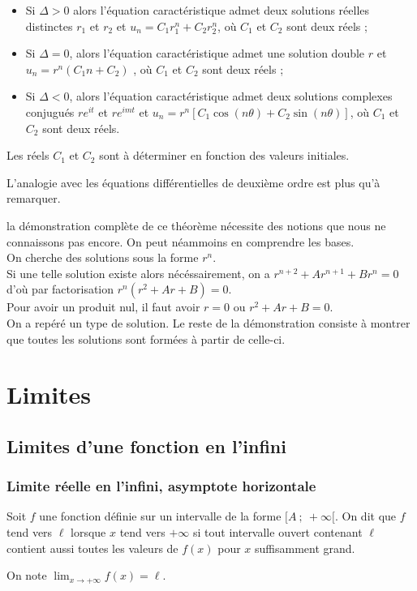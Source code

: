\documentclass[french]{book}
\newcommand{\ds}{\displaystyle}
\newcommand{\limpinf}[1][x]{\ds\lim_{#1\rightarrow +\infty}}
\newcommand{\eit}{e^{it}}
\newcommand{\eimt}{e^{imt}}
\newcommand{\cro}[1]{[#1]}
\begin{document}
\begin{thm}
\begin{itemize}
\item Si $\Delta>0$ alors l'équation caractéristique admet deux solutions réelles distinctes $r_1$ et $r_2$ et $u_n = C_1 r_1^n + C_2 r_2^n$, où $C_1$ et $C_2$ sont deux réels ;
\item Si $\Delta=0$, alors l'équation caractéristique admet une solution double $r$ et $u_n = r^n(C_1n+C_2)$ , où $C_1$ et $C_2$ sont deux réels ;
\item Si $\Delta < 0$, alors l'équation caractéristique admet deux solutions complexes conjugués $r\eit$ et $r\eimt$ et $ u_n = r^n\cro{C_1\cos(n\theta)+C_2\sin(n\theta)} $, où $C_1$ et $C_2$ sont deux réels.
\end{itemize}
Les réels $C_1$ et $C_2$ sont à déterminer en fonction des valeurs initiales.
\end{thm}

\begin{rem}
L'analogie avec les équations différentielles de deuxième ordre est plus qu'à remarquer.
\end{rem}

\begin{demo}
la démonstration complète de ce théorème nécessite des notions que nous ne connaissons pas encore. On peut néammoins en comprendre les bases.\\
On cherche des solutions sous la forme $r^n$.\\
Si une telle solution existe alors nécéssairement, on a $r^{n+2}+Ar^{n+1}+Br^n=0$ d'où par factorisation $r^n(r^2+Ar+B)=0$.\\
Pour avoir un produit nul, il faut avoir $r=0$ ou $r^2+Ar+B=0$.\\
On a repéré un type de solution. Le reste de la démonstration consiste à montrer que toutes les solutions sont formées à partir de celle-ci.
\end{demo}

\chapter{Limites}
\section{Limites d'une fonction en l'infini}
\subsection{Limite r\'eelle en l'infini, asymptote horizontale}
\begin{prop}
Soit $f$ une fonction d\'efinie sur un intervalle de la forme $[A~;~+\infty[$.
On dit que $f$ tend vers $\ell$ lorsque $x$ tend vers $+\infty$ si tout intervalle ouvert contenant $\ell$ contient aussi toutes les valeurs de $f(x)$ pour $x$ suffisamment grand.

On note $ \limpinf f(x)=\ell$.
\end{prop}
\end{document}
